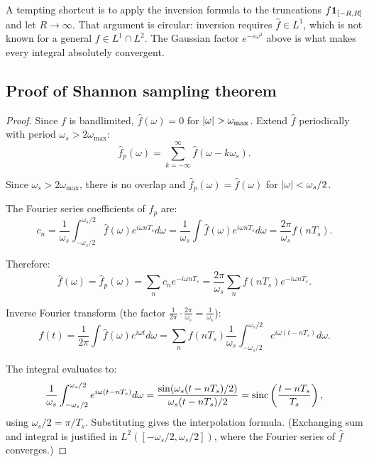 \begin{notechapter}
\begin{remark}
A tempting shortcut is to apply the inversion formula to the truncations $f\mathbf{1}_{[-R,R]}$ and let $R\to\infty$. That argument is circular: inversion requires $\hat f \in L^1$, which is not known for a general $f \in L^1\cap L^2$. The Gaussian factor $e^{-\varepsilon\omega^2}$ above is what makes every integral absolutely convergent.
\end{remark}

\subsection{Proof of Shannon sampling theorem}

\begin{proof}
Since $f$ is bandlimited, $\hat{f}(\omega) = 0$ for $\left|\omega\right| > \omega_{\max}$. Extend $\hat{f}$ periodically with period $\omega_s > 2\omega_{\max}$:
\[
\hat{f}_p(\omega) = \sum_{k=-\infty}^{\infty} \hat{f}(\omega - k\omega_s).
\]

Since $\omega_s > 2\omega_{\max}$, there is no overlap and $\hat{f}_p(\omega) = \hat{f}(\omega)$ for $\left|\omega\right| < \omega_s/2$.

The Fourier series coefficients of $\hat{f}_p$ are:
\[
c_n = \frac{1}{\omega_s} \int_{-\omega_s/2}^{\omega_s/2} \hat{f}(\omega) e^{i\omega n T_s} d\omega = \frac{1}{\omega_s} \int \hat{f}(\omega) e^{i\omega n T_s} d\omega = \frac{2\pi}{\omega_s} f(nT_s).
\]

Therefore:
\[
\hat{f}(\omega) = \hat{f}_p(\omega) = \sum_n c_n e^{-i\omega n T_s} = \frac{2\pi}{\omega_s} \sum_n f(nT_s) e^{-i\omega n T_s}.
\]

Inverse Fourier transform (the factor $\frac{1}{2\pi}\cdot\frac{2\pi}{\omega_s} = \frac1{\omega_s}$):
\[
f(t) = \frac{1}{2\pi} \int \hat{f}(\omega) e^{i\omega t} d\omega = \sum_n f(nT_s) \frac{1}{\omega_s} \int_{-\omega_s/2}^{\omega_s/2} e^{i\omega(t - nT_s)} d\omega.
\]

The integral evaluates to:
\[
\frac{1}{\omega_s} \int_{-\omega_s/2}^{\omega_s/2} e^{i\omega(t - nT_s)} d\omega = \frac{\sin(\omega_s(t - nT_s)/2)}{\omega_s(t - nT_s)/2} = \operatorname{sinc}\left(\frac{t - nT_s}{T_s}\right),
\]
using $\omega_s/2 = \pi/T_s$. Substituting gives the interpolation formula. (Exchanging sum and integral is justified in $L^2([-\omega_s/2,\omega_s/2])$, where the Fourier series of $\hat f$ converges.)
\end{proof}


\end{notechapter}
